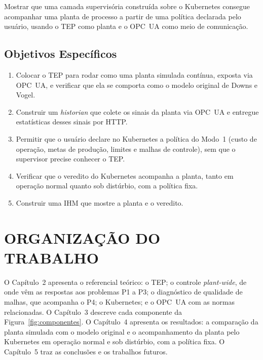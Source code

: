 Mostrar que uma camada supervisória construída sobre o Kubernetes consegue acompanhar uma planta de processo a partir de uma política declarada pelo usuário, usando o TEP como planta e o OPC~UA como meio de comunicação.

\subsection{Objetivos Específicos}
\begin{enumerate}
    \item Colocar o TEP para rodar como uma planta simulada contínua, exposta via OPC~UA, e verificar que ela se comporta como o modelo original de Downs e Vogel.
    \item Construir um \textit{historian} que colete os sinais da planta via OPC~UA e entregue estatísticas desses sinais por HTTP.
    \item Permitir que o usuário declare no Kubernetes a política do Modo~1 (custo de operação, metas de produção, limites e malhas de controle), sem que o supervisor precise conhecer o TEP.
    \item Verificar que o veredito do Kubernetes acompanha a planta, tanto em operação normal quanto sob distúrbio, com a política fixa.
    \item Construir uma IHM que mostre a planta e o veredito.
\end{enumerate}

\section{ORGANIZAÇÃO DO TRABALHO}

O Capítulo~2 apresenta o referencial teórico: o TEP; o controle \textit{plant-wide}, de onde vêm as respostas aos problemas P1 a P3; o diagnóstico de qualidade de malhas, que acompanha o P4; o Kubernetes; e o OPC~UA com as normas relacionadas. O Capítulo~3 descreve cada componente da Figura~\ref{fig:componentes}. O Capítulo~4 apresenta os resultados: a comparação da planta simulada com o modelo original e o acompanhamento da planta pelo Kubernetes em operação normal e sob distúrbio, com a política fixa. O Capítulo~5 traz as conclusões e os trabalhos futuros.
